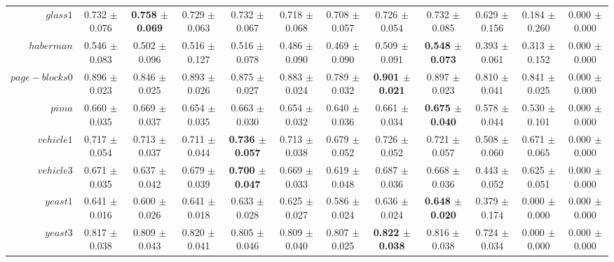 \begin{table}[!ht]
{\begin{tabular}{r c c c c c c c c c c c}
$glass1$ & 0.732 $\pm$ 0.076 & \textbf{0.758 $\pm$ 0.069} & 0.729 $\pm$ 0.063 & 0.732 $\pm$ 0.067 & 0.718 $\pm$ 0.068 & 0.708 $\pm$ 0.057 & 0.726 $\pm$ 0.054 & 0.732 $\pm$ 0.085 & 0.629 $\pm$ 0.156 & 0.184 $\pm$ 0.260 & 0.000 $\pm$ 0.000 \\
$haberman$ & 0.546 $\pm$ 0.083 & 0.502 $\pm$ 0.096 & 0.516 $\pm$ 0.127 & 0.516 $\pm$ 0.078 & 0.486 $\pm$ 0.090 & 0.469 $\pm$ 0.090 & 0.509 $\pm$ 0.091 & \textbf{0.548 $\pm$ 0.073} & 0.393 $\pm$ 0.061 & 0.313 $\pm$ 0.152 & 0.000 $\pm$ 0.000 \\
$page-blocks0$ & 0.896 $\pm$ 0.023 & 0.846 $\pm$ 0.025 & 0.893 $\pm$ 0.026 & 0.875 $\pm$ 0.027 & 0.883 $\pm$ 0.024 & 0.789 $\pm$ 0.032 & \textbf{0.901 $\pm$ 0.021} & 0.897 $\pm$ 0.023 & 0.810 $\pm$ 0.041 & 0.841 $\pm$ 0.025 & 0.000 $\pm$ 0.000 \\
$pima$ & 0.660 $\pm$ 0.035 & 0.669 $\pm$ 0.037 & 0.654 $\pm$ 0.035 & 0.663 $\pm$ 0.030 & 0.654 $\pm$ 0.032 & 0.640 $\pm$ 0.036 & 0.661 $\pm$ 0.034 & \textbf{0.675 $\pm$ 0.040} & 0.578 $\pm$ 0.044 & 0.530 $\pm$ 0.101 & 0.000 $\pm$ 0.000 \\
$vehicle1$ & 0.717 $\pm$ 0.054 & 0.713 $\pm$ 0.037 & 0.711 $\pm$ 0.044 & \textbf{0.736 $\pm$ 0.057} & 0.713 $\pm$ 0.038 & 0.679 $\pm$ 0.052 & 0.726 $\pm$ 0.052 & 0.721 $\pm$ 0.057 & 0.508 $\pm$ 0.060 & 0.671 $\pm$ 0.065 & 0.000 $\pm$ 0.000 \\
$vehicle3$ & 0.671 $\pm$ 0.035 & 0.637 $\pm$ 0.042 & 0.679 $\pm$ 0.039 & \textbf{0.700 $\pm$ 0.047} & 0.669 $\pm$ 0.033 & 0.619 $\pm$ 0.048 & 0.687 $\pm$ 0.036 & 0.668 $\pm$ 0.036 & 0.443 $\pm$ 0.052 & 0.625 $\pm$ 0.051 & 0.000 $\pm$ 0.000 \\
$yeast1$ & 0.641 $\pm$ 0.016 & 0.600 $\pm$ 0.026 & 0.641 $\pm$ 0.018 & 0.633 $\pm$ 0.028 & 0.625 $\pm$ 0.027 & 0.586 $\pm$ 0.024 & 0.636 $\pm$ 0.024 & \textbf{0.648 $\pm$ 0.020} & 0.379 $\pm$ 0.174 & 0.000 $\pm$ 0.000 & 0.000 $\pm$ 0.000 \\
$yeast3$ & 0.817 $\pm$ 0.038 & 0.809 $\pm$ 0.043 & 0.820 $\pm$ 0.041 & 0.805 $\pm$ 0.046 & 0.809 $\pm$ 0.040 & 0.807 $\pm$ 0.025 & \textbf{0.822 $\pm$ 0.038} & 0.816 $\pm$ 0.038 & 0.724 $\pm$ 0.034 & 0.000 $\pm$ 0.000 & 0.000 $\pm$ 0.000 \\
\end{tabular}}
\end{table}
